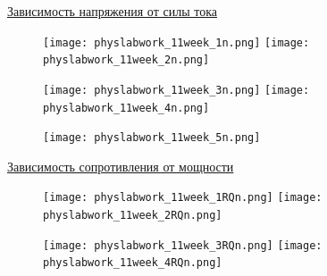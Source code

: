 \documentclass[a4paper,12pt]{article} %
\begin{document}
\hypertarget{p7}{\hyperlink{p4}{Зависимость напряжения от силы тока}} 

\begin{figure}[h!]
\begin{floatrow}
         {\texttt{[image: physlabwork\_11week\_1n.png]}}
         {\texttt{[image: physlabwork\_11week\_2n.png]}}         
\end{floatrow}
\end{figure}

\begin{figure}[h!]
\begin{floatrow}
         {\texttt{[image: physlabwork\_11week\_3n.png]}}
         {\texttt{[image: physlabwork\_11week\_4n.png]}}         
\end{floatrow}
\end{figure}

\begin{figure}[h!]
\begin{floatrow}
         {\texttt{[image: physlabwork\_11week\_5n.png]}}     
\end{floatrow}
\end{figure}
\restoregeometry


\hypertarget{p8}{\hyperlink{p4}{Зависимость сопротивления от мощности}} 

\begin{figure}[h!]
\begin{floatrow}
         {\texttt{[image: physlabwork\_11week\_1RQn.png]}}
         {\texttt{[image: physlabwork\_11week\_2RQn.png]}}         
\end{floatrow}
\end{figure}

\begin{figure}[h!]
\begin{floatrow}
         {\texttt{[image: physlabwork\_11week\_3RQn.png]}}
         {\texttt{[image: physlabwork\_11week\_4RQn.png]}}         
\end{floatrow}
\end{figure}
\end{document}

